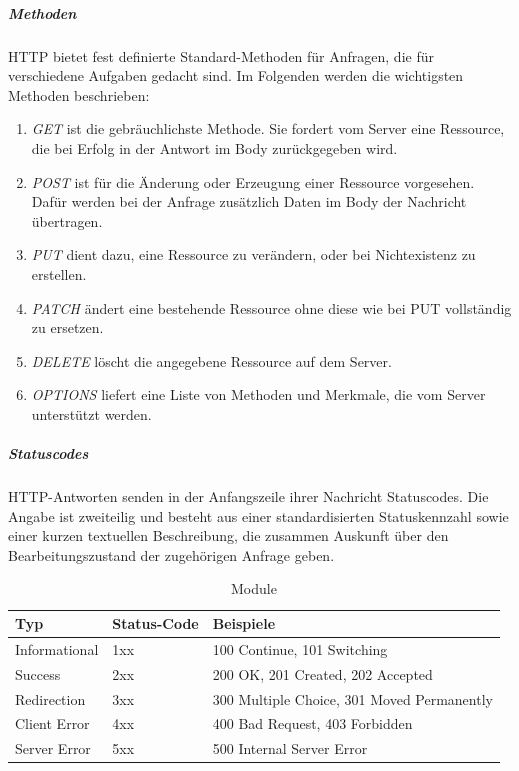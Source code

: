 \subparagraph{Methoden}
HTTP bietet fest definierte Standard-Methoden für Anfragen, die für verschiedene Aufgaben gedacht sind. Im Folgenden werden die wichtigsten Methoden beschrieben:

\begin{enumerate}
		\item \textit{GET} ist die gebräuchlichste Methode. Sie fordert vom Server eine Ressource, die bei Erfolg in der Antwort im Body zurückgegeben wird. 
		
		\item \textit{POST} ist für die Änderung oder Erzeugung einer Ressource vorgesehen. Dafür werden bei der Anfrage zusätzlich Daten im Body der Nachricht übertragen.
		
		\item \textit{PUT} dient dazu, eine Ressource zu verändern, oder bei Nichtexistenz zu erstellen.
	
		\item \textit{PATCH} ändert eine bestehende Ressource ohne diese wie bei PUT vollständig zu ersetzen. 
		
		\item \textit{DELETE} löscht die angegebene Ressource auf dem Server.
		
		\item \textit{OPTIONS} liefert eine Liste von Methoden und Merkmale, die vom Server unterstützt werden.
		
\end{enumerate}
\newpage

\subparagraph{Statuscodes}
HTTP-Antworten senden in der Anfangszeile ihrer Nachricht Statuscodes. Die Angabe ist zweiteilig und besteht aus einer standardisierten Statuskennzahl sowie einer kurzen textuellen Beschreibung, die zusammen Auskunft über den Bearbeitungszustand der zugehörigen Anfrage geben.\newline

\begin{table}[h]
\begin{center}
    \begin{tabular}{| l | l |  p{8cm} |}
    \hline
    Typ & Status-Code & Beispiele \\ \hline
    
    Informational & 1xx & 100 Continue, 101 Switching\\
    
    \hline
    Success & 2xx & 200 OK, 201 Created, 202 Accepted  \\
    
    \hline
	Redirection & 3xx & 300 Multiple Choice, 301 Moved Permanently  \\
	
    \hline    
    Client Error & 4xx & 400 Bad Request, 403 Forbidden\\ 
    
    \hline    
    Server Error & 5xx & 500 Internal Server Error \\
    \hline
    \end{tabular}
\end{center}
\caption{Module}
\end{table}

